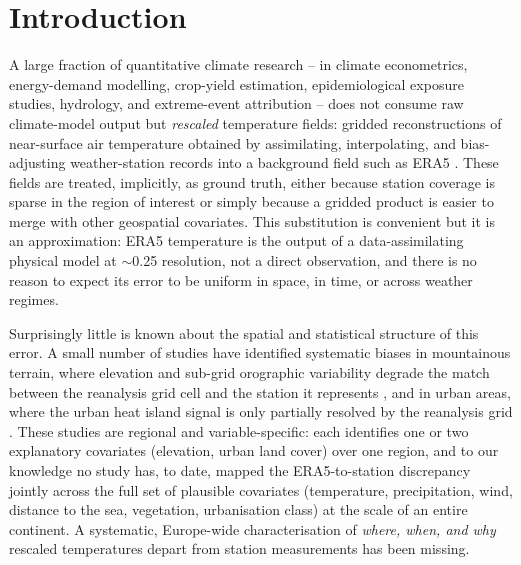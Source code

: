 \documentclass[a4paper,12pt,leqno]{article}
\begin{document}
\section{Introduction}
\label{sec:intro}

A large fraction of quantitative climate research -- in climate
econometrics, energy-demand modelling, crop-yield estimation,
epidemiological exposure studies, hydrology, and extreme-event
attribution -- does not consume raw climate-model output but
\emph{rescaled} temperature fields: gridded reconstructions of
near-surface air temperature obtained by assimilating, interpolating, and
bias-adjusting weather-station records into a background field such as
ERA5 \parencite{TODO:era5_hersbach2020}. These fields are treated,
implicitly, as ground truth, either because station coverage is sparse in
the region of interest or simply because a gridded product is easier to
merge with other geospatial covariates. This substitution is convenient
but it is an approximation: ERA5 temperature is the output of a
data-assimilating physical model at $\sim$0.25\textdegree{} resolution,
not a direct observation, and there is no reason to expect its error to
be uniform in space, in time, or across weather regimes.

Surprisingly little is known about the spatial and statistical structure
of this error. A small number of studies have identified systematic
biases in mountainous terrain, where elevation and sub-grid orographic
variability degrade the match between the reanalysis grid cell and the
station it represents
\parencite{satyapragyan2026bias,sebbar2023ml_downscaling,jacobs2024filling,nogueira2022assessment,zou2022performance},
and in urban areas, where the urban heat island signal is only partially
resolved by the reanalysis grid
\parencite{jacobs2024filling,nogueira2022assessment,zou2022performance}.
These studies are regional and variable-specific: each identifies one or
two explanatory covariates (elevation, urban land cover) over one region,
and to our knowledge no study has, to date, mapped the ERA5-to-station
discrepancy jointly across the full set of plausible covariates
(temperature, precipitation, wind, distance to the sea, vegetation,
urbanisation class) at the scale of an entire continent. A systematic,
Europe-wide characterisation of \emph{where, when, and why} rescaled
temperatures depart from station measurements has been missing.
\end{document}
